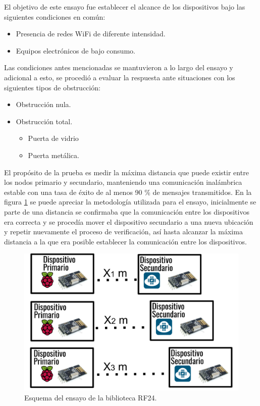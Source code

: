 El objetivo de este ensayo fue establecer el alcance de los dispositivos bajo las siguientes condiciones en común: 
\begin{itemize}
\item Presencia de redes WiFi de diferente intensidad.
\item Equipos electrónicos de bajo consumo.
\end{itemize}

Las condiciones antes mencionadas se mantuvieron a lo largo del ensayo y adicional a esto, se procedió a evaluar la respuesta ante situaciones con los siguientes tipos de obstrucción:  
\begin{itemize}
\item Obstrucción nula.
\item Obstrucción total.
	\begin{itemize}
	\item  Puerta de vidrio
	\item  Puerta metálica.
	\end{itemize} 
\end{itemize}  

El propósito de la prueba es medir la máxima distancia que puede existir entre los nodos primario y secundario, manteniendo una comunicación inalámbrica estable con una tasa de éxito de al menos 90 \% de mensajes transmitidos. En la figura \ref{fig:figura_c} se puede apreciar la metodología utilizada para el ensayo, inicialmente se parte de una distancia se confirmaba que la comunicación entre los dispositivos era correcta y se procedía mover el dispositivo secundario a una nueva ubicación y repetir nuevamente el proceso de verificación, así hasta alcanzar la máxima distancia a la que era posible establecer la comunicación entre los dispositivos. 

\begin{figure}[ht]
	\centering
	\includegraphics[scale=.3]{./Figures/Capitulo4/Figura_C.png}
	\caption{Esquema del ensayo de la biblioteca RF24.}
	\label{fig:figura_c}
\end{figure}

